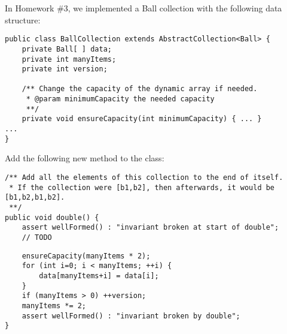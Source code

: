 \documentclass[12pt]{article}
\begin{document}
\newpage
\maketitle

In Homework \#3, we implemented a Ball collection with the following data structure:
\begin{verbatim}
public class BallCollection extends AbstractCollection<Ball> {
    private Ball[ ] data;
    private int manyItems;
    private int version;
    
    /** Change the capacity of the dynamic array if needed.
     * @param minimumCapacity the needed capacity
     **/
    private void ensureCapacity(int minimumCapacity) { ... }
...
}
\end{verbatim}
Add the following new method to the class:
\begin{verbatim}
/** Add all the elements of this collection to the end of itself.
 * If the collection were [b1,b2], then afterwards, it would be [b1,b2,b1,b2].
 **/
public void double() {
    assert wellFormed() : "invariant broken at start of double";
    // TODO
\end{verbatim}
\begin{solution}
\begin{verbatim}
    ensureCapacity(manyItems * 2);
    for (int i=0; i < manyItems; ++i) {
        data[manyItems+i] = data[i];
    }
    if (manyItems > 0) ++version;
    manyItems *= 2;
    assert wellFormed() : "invariant broken by double";
}
\end{verbatim}
\end{solution}
\end{document}
